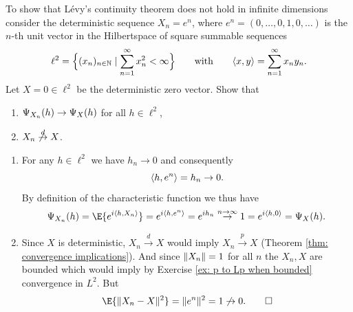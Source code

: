 
\begin{exercise}[subtitle={Lévy's continuity theorem in infinite dimensions \Coffeecup}]
    \label{ex: counterexample levy's continuity in infinite dim}
    To show that Lévy's continuity theorem does not hold in infinite dimensions
    consider the deterministic sequence \(X_n = e^n\), where \(e^n=(0,\dots,0, 1, 0, \dots)\) is the
    \(n\)-th unit vector in the Hilbertspace of square summable sequences 
    \[
        \ell^2 = \set[\Big]{(x_n)_{n\in \nat} \mid \sum_{n=1}^\infty x_n^2 < \infty}
        \qquad\text{with}\qquad
        \scp{x, y} = \sum_{n=1}^\infty x_n y_n.
    \]
    Let \(X=0\in \ell^2\) be the deterministic zero vector. Show that
    \begin{enumerate}[label=(\alph*), noitemsep]
        \item\label{it: (counterexample levy's continuity in infinite dim) charfct}
        \(\charFct_{X_n}(h) \to \charFct_{X}(h)\) for all \(h\in \ell^2\),
        \item\label{it: (counterexample levy's continuity in infinite dim) convergence in distribution}
        \(X_n \not\overset{d}\to X\).
    \end{enumerate}
\end{exercise}

\begin{solution}
\begin{enumerate}[wide=0pt, noitemsep]
    \item[\ref{it: (counterexample levy's continuity in infinite dim) charfct}]
    For any \(h\in \ell^2\) we have \(h_n \to 0\) and consequently
    \[
        \scp{h, e^n} = h_n \to 0.
    \]
    By definition of the characteristic function we thus have
    \[
        \charFct_{X_n}(h)
        = \E{e^{i\scp{h, X_n}}}
        = e^{i\scp{h, e^n}}
        = e^{i h_n}
        \overset{n\to\infty}\to 1
        = e^{i\scp{h, 0}}
        = \charFct_X(h).
    \]
    \item[\ref{it: (counterexample levy's continuity in infinite dim) convergence in distribution}]
    Since \(X\) is deterministic, \(X_n \overset{d}\to X\) would imply \(X_n
    \overset{p}\to X\) (Theorem \ref{thm: convergence implications}).
    And since \(\norm{X_n} = 1\) for all \(n\) the \(X_n, X\) are bounded
    which would imply by Exercise \ref{ex: p to Lp when bounded}
    convergence in \(L^2\). But
    \[
        \E{\norm{X_n - X}^2}
        = \norm{e^n}^2
        = 1
        \not\to 0.
        \qedhere
    \]
\end{enumerate}    
\end{solution}
